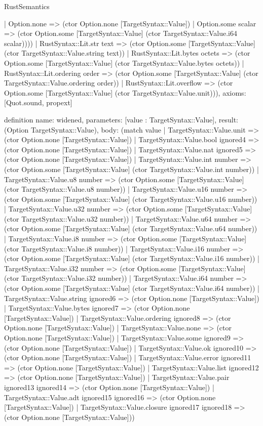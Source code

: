 \begin{lexlean}{RustSemantics}
\begin{semanticmodule}
{        | Option.none => (ctor Option.none [TargetSyntax::Value])
        | Option.some scalar => (ctor Option.some [TargetSyntax::Value] (ctor TargetSyntax::Value.i64 scalar))))
    | RustSyntax::Lit.str text => (ctor Option.some [TargetSyntax::Value] (ctor TargetSyntax::Value.string text))
    | RustSyntax::Lit.bytes octets => (ctor Option.some [TargetSyntax::Value] (ctor TargetSyntax::Value.bytes octets))
    | RustSyntax::Lit.ordering order => (ctor Option.some [TargetSyntax::Value] (ctor TargetSyntax::Value.ordering order))
    | RustSyntax::Lit.overflow => (ctor Option.some [TargetSyntax::Value] (ctor TargetSyntax::Value.unit))),
  axioms: [Quot.sound, propext]
}

definition{
  name: widened,
  parameters: [value : TargetSyntax::Value],
  result: (Option TargetSyntax::Value),
  body: (match value
    | TargetSyntax::Value.unit => (ctor Option.none [TargetSyntax::Value])
    | TargetSyntax::Value.bool ignored4 => (ctor Option.none [TargetSyntax::Value])
    | TargetSyntax::Value.nat ignored5 => (ctor Option.none [TargetSyntax::Value])
    | TargetSyntax::Value.int number => (ctor Option.some [TargetSyntax::Value] (ctor TargetSyntax::Value.int number))
    | TargetSyntax::Value.u8 number => (ctor Option.some [TargetSyntax::Value] (ctor TargetSyntax::Value.u8 number))
    | TargetSyntax::Value.u16 number => (ctor Option.some [TargetSyntax::Value] (ctor TargetSyntax::Value.u16 number))
    | TargetSyntax::Value.u32 number => (ctor Option.some [TargetSyntax::Value] (ctor TargetSyntax::Value.u32 number))
    | TargetSyntax::Value.u64 number => (ctor Option.some [TargetSyntax::Value] (ctor TargetSyntax::Value.u64 number))
    | TargetSyntax::Value.i8 number => (ctor Option.some [TargetSyntax::Value] (ctor TargetSyntax::Value.i8 number))
    | TargetSyntax::Value.i16 number => (ctor Option.some [TargetSyntax::Value] (ctor TargetSyntax::Value.i16 number))
    | TargetSyntax::Value.i32 number => (ctor Option.some [TargetSyntax::Value] (ctor TargetSyntax::Value.i32 number))
    | TargetSyntax::Value.i64 number => (ctor Option.some [TargetSyntax::Value] (ctor TargetSyntax::Value.i64 number))
    | TargetSyntax::Value.string ignored6 => (ctor Option.none [TargetSyntax::Value])
    | TargetSyntax::Value.bytes ignored7 => (ctor Option.none [TargetSyntax::Value])
    | TargetSyntax::Value.ordering ignored8 => (ctor Option.none [TargetSyntax::Value])
    | TargetSyntax::Value.none => (ctor Option.none [TargetSyntax::Value])
    | TargetSyntax::Value.some ignored9 => (ctor Option.none [TargetSyntax::Value])
    | TargetSyntax::Value.ok ignored10 => (ctor Option.none [TargetSyntax::Value])
    | TargetSyntax::Value.error ignored11 => (ctor Option.none [TargetSyntax::Value])
    | TargetSyntax::Value.list ignored12 => (ctor Option.none [TargetSyntax::Value])
    | TargetSyntax::Value.pair ignored13 ignored14 => (ctor Option.none [TargetSyntax::Value])
    | TargetSyntax::Value.adt ignored15 ignored16 => (ctor Option.none [TargetSyntax::Value])
    | TargetSyntax::Value.closure ignored17 ignored18 => (ctor Option.none [TargetSyntax::Value]))
}


\end{semanticmodule}
\end{lexlean}
